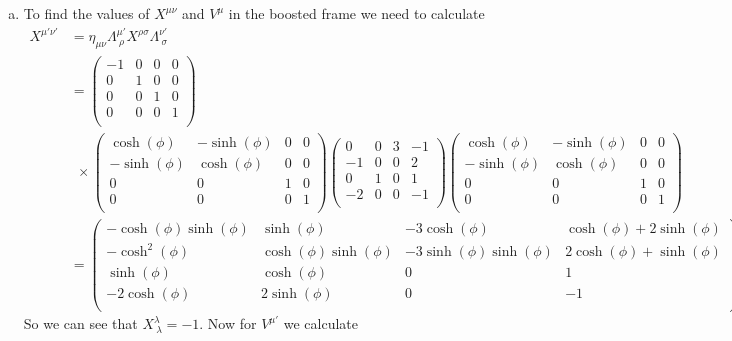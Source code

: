 \documentclass[11pt]{article}
\numberwithin{equation}{section}
\begin{document}
\begin{enumerate}[(a)]
\item
To find the values of $X^{\mu\nu}$ and $V^{\mu}$ in the boosted frame we need to calculate
\begin{align*}
X^{\mu'\nu'} &= \eta_{\mu\nu}\Lambda^{\mu'}_{\ \rho}X^{\rho\sigma}\Lambda^{\nu'}_{\ \sigma}\\
	&=	\left(\begin{array}{cccc}
			-1 &0 &0 &0\\
			0 &1 &0 &0\\
			0 &0 &1 &0\\
			0 &0 &0 &1\\
		\end{array}\right)\\
 &\ \ \times\left(\begin{array}{cccc}
	\cosh(\phi) &-\sinh(\phi) &0 &0\\
	-\sinh(\phi) &\cosh(\phi) &0 &0\\
	0 &0 &1 &0\\
	0 &0 &0 &1\\
\end{array}\right)
\left(\begin{array}{cccc}
	0 &0 &3 &-1\\
	-1 &0 &0 &2\\
	0 &1 &0 &1\\
	-2 &0 &0 &-1\\
\end{array}\right)
\left(\begin{array}{cccc}
	\cosh(\phi) &-\sinh(\phi) &0 &0\\
	-\sinh(\phi) &\cosh(\phi) &0 &0\\
	0 &0 &1 &0\\
	0 &0 &0 &1\\
\end{array}\right)\\
&= \left(\begin{array}{cccc}
	-\cosh(\phi)\sinh(\phi) &\sinh(\phi) &-3\cosh(\phi) &\cosh(\phi)+2\sinh(\phi)\\
	-\cosh^2(\phi) &\cosh(\phi)\sinh(\phi) &-3\sinh(\phi)\sinh(\phi) &2\cosh(\phi)+\sinh(\phi)\\
	\sinh(\phi) &\cosh(\phi) &0 &1\\
	-2\cosh(\phi) &2\sinh(\phi) &0 &-1\\
\end{array}\right)
\end{align*}
So we can see that $X^{\lambda}_{\ \lambda} = -1$. Now for $V^{\mu'}$ we calculate
\begin{align*}

\end{align*}
\end{enumerate}
\end{document}
